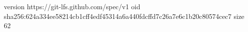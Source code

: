 version https://git-lfs.github.com/spec/v1
oid sha256:624a334ee58214cb1cff4edf45314a6a440fdcffd7c26a7e6c1b20c80574cec7
size 62
